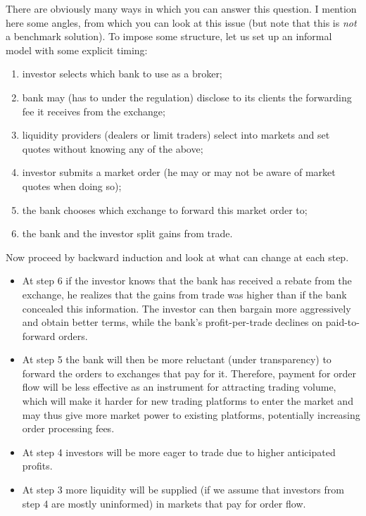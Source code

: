 \documentclass[11pt
, answers
]{exam}
\begin{document}
\begin{solution}
	There are obviously many ways in which you can answer this question. I mention here some angles, from which you can look at this issue (but note that this is \emph{not} a benchmark solution). To impose some structure, let us set up an informal model with some explicit timing:
	\begin{enumerate}
		\item investor selects which bank to use as a broker;
		\item bank may (has to under the regulation) disclose to its clients the forwarding fee it receives from the exchange;
		\item liquidity providers (dealers or limit traders) select into markets and set quotes without knowing any of the above;
		\item investor submits a market order (he may or may not be aware of market quotes when doing so);
		\item the bank chooses which exchange to forward this market order to;
		\item the bank and the investor split gains from trade.
	\end{enumerate}
	
	Now proceed by backward induction and look at what can change at each step.
	\begin{itemize}[nolistsep,noitemsep]
		\item At step 6 if the investor knows that the bank has received a rebate from the exchange, he realizes that the gains from trade was higher than if the bank concealed this information. The investor can then bargain more aggressively and obtain better terms, while the bank's profit-per-trade declines on paid-to-forward orders.
		
		\item At step 5 the bank will then be more reluctant (under transparency) to forward the orders to exchanges that pay for it. Therefore, payment for order flow will be less effective as an instrument for attracting trading volume, which will make it harder for new trading platforms to enter the market and may thus give more market power to existing platforms, potentially increasing order processing fees.
		
		\item At step 4 investors will be more eager to trade due to higher anticipated profits.
		
		\item At step 3 more liquidity will be supplied (if we assume that investors from step 4 are mostly uninformed) in markets that pay for order flow.
		

\end{itemize}
\end{solution}
\end{document}
